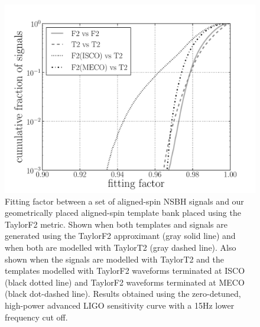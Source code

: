 \begin{figure}
\begin{center}
\includegraphics[width=1.0\textwidth]
{papers/nsbh_effectualness/figure3.pdf}
\end{center}
\caption{\label{fig:bankF2verification}
Fitting factor between a set of aligned-spin \ac{NSBH} signals and our
geometrically placed aligned-spin template bank placed using the TaylorF2
metric. Shown when both templates and signals are generated using
the TaylorF2 approximant (gray solid line) and when both are modelled with
TaylorT2 (gray
dashed line). Also shown when the signals are modelled with TaylorT2 and the
templates modelled
with TaylorF2 waveforms terminated at ISCO (black dotted line) and TaylorF2
waveforms terminated at MECO (black dot-dashed line). Results obtained
using the zero-detuned, high-power advanced LIGO sensitivity curve with a 15Hz
lower frequency cut off.
}
\end{figure}

